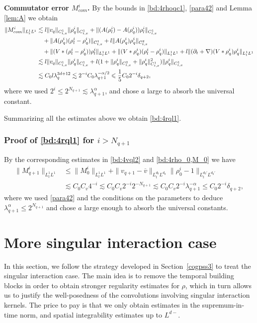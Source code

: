 \documentclass[10pt,a4paper]{amsart}
\numberwithin{equation}{section}
\def\leq{\leqslant}
\def\leq{\leqslant}
\begin{document}
\textbf{Commutator error $M_{com}^i$.} By  the bounds in   \eqref{bd:4rhoqc1}, \eqref{para42} and Lemma \ref{lem:A}  we obtain
 \begin{align}
  \|M_{ com}^i\|_{L_t^1L^1}&\lesssim l\|v_q\|_{C_{t,x}^1}\|\rho_q^i \|_{C_{t,x}^1}+\|(A(\rho_l^i) -A(\rho_q^i)) \rho_l^i\|_{C_{t,x}^1} \notag\\ 
  &\quad+\|A(\rho_q^i)( \rho_l^i- \rho_q^i)\|_{C_{t,x}^1}+l\|A(\rho_q^i) \rho_q^i\|_{C_{t,x}^2}\notag\\
  &\quad +\|(V*(\rho_l^i-\rho_q^i))\rho_l^i\|_{L_{t}^1L^1} +\|(V*\rho_q^i)(\rho_l^i- \rho_q^i)\|_{L_{t}^1L^1} + l\|(\partial_t+\nabla)(V*\rho_q^i)\rho_q^i\|_{L_{t}^1L^1}\notag\\
 & \lesssim l\|v_q\|_{C_{t,x}^1}\|\rho_q^i\|_{C_{t,x}^1}+l (1+  \| \rho_q^i\|_{C_{t,x}^2}+\| \rho_q^i\|_{C_{t,x}^1}^2)\| \rho_q^i\|_{C_{t,x}^1}\notag\\
 &\lesssim C_0 l\lambda_q^{3d+12}\lesssim  2^{-i}C_0  \lambda_{q+1}^{-\alpha/2}\leq \frac{1}{5}C_02^{-i}\delta_{q+2},\label{bd:4mcom}
   \end{align}  
   where we used $2^i\leq2^{N_{q+1}}\lesssim \lambda_{q+1}^\alpha$, and  chose $a$ large to absorb the universal constant.
   
Summarizing all the estimates above  we obtain   \eqref{bd:4rql1}. 


\subsubsection{Proof of  \eqref{bd:4rql1} for $i> N_{q+1}$}\label{sec:estmq+1big}



By the corresponding estimates in  \eqref{bd:4vql2} and \eqref{bd:4rho_0,M_0}  we have
\begin{align*}
    \|M^{i}_{q+1}\|_{L^1_tL^1}&\leq \|M^{i}_{0}\|_{L^1_tL^1}+\|v_{q+1}-\overline v\|_{L^{d_0}_tL^{d_0}}\|\rho^{i}_0-1\|_{L^{d_0'}_tL^{d_0'}}\\
    &\lesssim C_0 C_v 4^{-i}\lesssim C_0 C_v2^{-i}2^{-N_{q+1}}\lesssim C_0 C_v 2^{-i}\lambda_{q+1}^{-\alpha}\leq C_0 2^{-i}\delta_{q+2},
\end{align*}
where we  used \eqref{para42} and the conditions on the parameters  to deduce 
$\lambda_{q+1}^{\alpha}\leq2^{N_{q+1}} $ and chose $a$ large enough to absorb the universal constants.
 





\section{More singular interaction  case}\label{cogpss6} 
In this section, we follow the strategy developed in Section~\ref{cogpss3} to treat the singular interaction case. 
The main idea is to remove the temporal building blocks in order to obtain stronger regularity estimates for $\rho$, which in turn allows us to justify the well-posedness of the convolutions involving singular interaction kernels. The price to pay is that we only obtain estimates in the supremum-in-time norm, and spatial integrability estimates up to $L^{d-}$.
 
\end{document}
